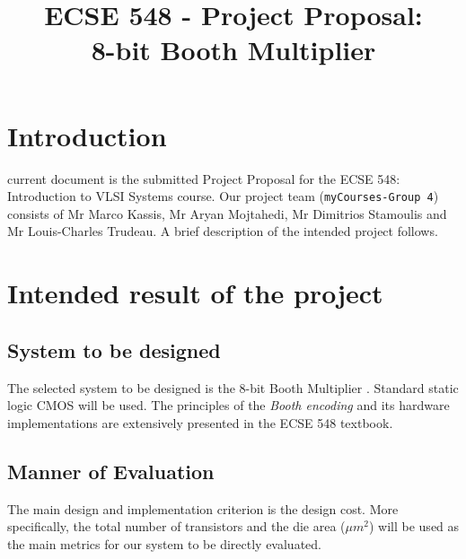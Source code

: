 \documentclass[conference]{IEEEtran}
\begin{document}
\title{ECSE 548 - Project Proposal:\\8-bit Booth Multiplier}

\author{
}


\maketitle
\IEEEpeerreviewmaketitle

\section{Introduction}
 current document is the 
submitted Project Proposal for the 
ECSE 548: Introduction to VLSI Systems	
course. Our project team (\texttt{myCourses-Group 4}) 
consists of Mr Marco Kassis, Mr Aryan Mojtahedi, Mr Dimitrios Stamoulis and
Mr Louis-Charles Trudeau. A brief description of 
the intended project follows. 



\section{Intended result of the project}
\subsection{System to be designed}

The selected system to be
designed is the 8-bit Booth Multiplier \cite{booth}\cite{macS}. 
Standard static logic CMOS will be used. 
The principles of the \emph{Booth encoding} and its 
hardware implementations are extensively 
presented in the ECSE 548 textbook\cite{tb}.


\subsection{Manner of Evaluation}

The main design and implementation criterion is 
the design cost. More specifically, the total number
of transistors and the die area ($\mu m^2$) 
will be used as the main metrics for our system 
to be directly evaluated. 
\end{document}
